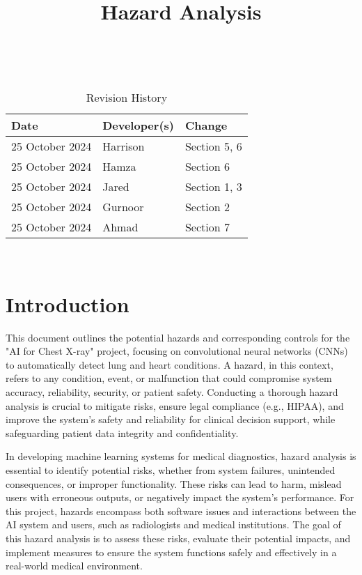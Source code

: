 \documentclass{article}
\title{Hazard Analysis\\\progname}
\author{\authname}
\date{}
\begin{document}
\maketitle
\thispagestyle{empty}

~\newpage


\begin{table}[hp]
  \caption{Revision History} \label{TblRevisionHistory}
  \begin{tabularx}{\textwidth}{llX}
    \toprule
    \textbf{Date} & \textbf{Developer(s)} & \textbf{Change}\\
    \midrule
    25 October 2024 & Harrison & Section 5, 6 \\
    25 October 2024 & Hamza & Section 6 \\
    25 October 2024 & Jared & Section 1, 3 \\
    25 October 2024 & Gurnoor & Section 2 \\
    25 October 2024 & Ahmad & Section 7\\
    \bottomrule
  \end{tabularx}
\end{table}

~\newpage


\section{Introduction}

This document outlines the potential hazards and corresponding controls for the "AI for Chest
X-ray" project, focusing on convolutional neural networks (CNNs) to automatically detect lung and
heart conditions. A hazard, in this context, refers to any condition, event, or malfunction that
could compromise system accuracy, reliability, security, or patient safety. Conducting a thorough
hazard analysis is crucial to mitigate risks, ensure legal compliance (e.g., HIPAA), and improve
the system's safety and reliability for clinical decision support, while safeguarding patient
data integrity and confidentiality.

In developing machine learning systems for medical diagnostics, hazard analysis is essential to
identify potential risks, whether from system failures, unintended consequences, or improper
functionality. These risks can lead to harm, mislead users with erroneous outputs, or negatively
impact the system’s performance. For this project, hazards encompass both software issues and
interactions between the AI system and users, such as radiologists and medical institutions. The
goal of this hazard analysis is to assess these risks, evaluate their potential impacts, and
implement measures to ensure the system functions safely and effectively in a real-world medical
environment.
\end{document}
